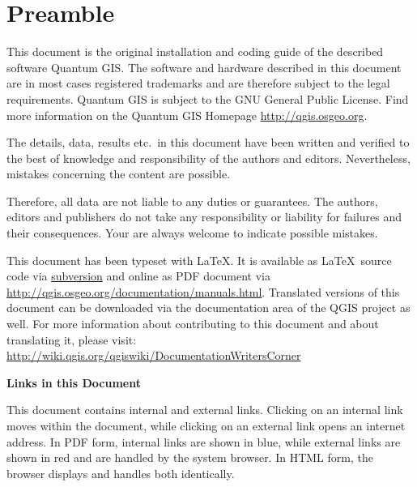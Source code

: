 
\thispagestyle{empty}


\section*{Preamble}


\vspace{1cm}

This document is the original installation and coding guide of the described 
software Quantum GIS. The software and hardware described in this 
document are in most cases registered trademarks and are therefore subject 
to the legal requirements. Quantum GIS is subject to the GNU General Public 
License. Find more information on the Quantum GIS Homepage
\url{http://qgis.osgeo.org}.

The details, data, results etc.~in this document have been 
written and verified to the best of knowledge and responsibility of the 
authors and editors. Nevertheless, mistakes concerning the content are possible.

Therefore, all data are not liable to any duties or guarantees. The authors, editors 
and publishers do not take any responsibility or liability for failures and 
their consequences. Your are always welcome to indicate possible mistakes.

This document has been typeset with \LaTeX. It is available as \LaTeX~source
code via \href{http://wiki.qgis.org/qgiswiki/DocumentationWritersCorner}{subversion} 
and online as PDF document via \url{http://qgis.osgeo.org/documentation/manuals.html}. 
Translated versions of this document can be downloaded via the documentation 
area of the QGIS project as well. For more information about contributing to
this document and about translating it, please visit: \url{http://wiki.qgis.org/qgiswiki/DocumentationWritersCorner} 

\textbf{Links in this Document}

This document contains internal and external links.  Clicking on an
internal link moves within the document, while clicking on an external link
opens an internet address.  In PDF form, internal links are shown in blue,
while external links are shown in red and are handled by the
system browser. In HTML form, the browser displays and handles both
identically. 

